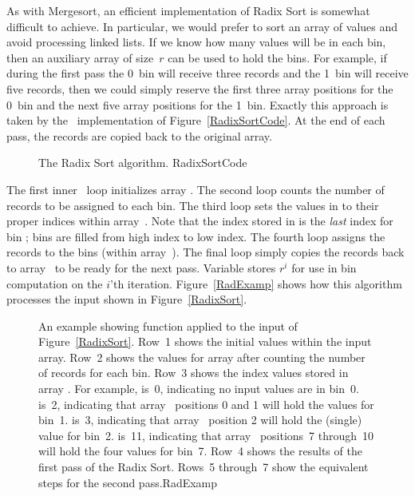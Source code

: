 As with Mergesort,
an efficient implementation of Radix Sort is
somewhat difficult to achieve.
In particular, we would prefer to sort
an array of values and avoid processing linked lists.  If we know how
many values will be in each bin, then an auxiliary array of size~\(r\)
can be used to hold the bins.
For example, if during the first pass the 0~bin will receive three
records and the 1~bin will receive five records, then we could simply
reserve the first three array positions for the 0~bin and the next
five array positions for the 1~bin.
Exactly this approach is taken by the \Lang\ implementation of
Figure~\ref{RadixSortCode}.
At the end of each pass, the records are copied back to the original
array.

\begin{figure}

\vspace{-\bigskipamount}
\vspace{-\smallskipamount}

{The Radix Sort algorithm.}
{RadixSortCode}
\vspace{-\smallskipamount}
\end{figure}

\newpage

The first inner \Cfor\ loop initializes array .  The
second loop counts the number of records to be assigned to each bin.
The third loop sets the values in  to their proper indices
within array~.
Note that the index stored in 
is the \emph{last} index for bin ; bins are filled from high
index to low index.
The fourth loop assigns the records to the bins (within
array~).
The final loop simply copies the records back to
array~ to be ready for the next pass.
Variable  stores \(r^i\) for use in bin computation on the
\(i\)'th iteration.
Figure~\ref{RadExamp} shows how this algorithm processes the input
shown in Figure~\ref{RadixSort}.

\begin{figure}
\bigskip
{}
{An example showing function  applied to the input of
Figure~\ref{RadixSort}.
Row~1 shows the initial values within the input array.
Row~2 shows the values for array  after
counting the number of records for each bin.
Row~3 shows the index values stored in array .
For example,  is~0, indicating no input values are in
bin~0.
 is~2, indicating that array~ positions 0 and 1
will hold the values for bin~1.
 is~3, indicating that array~ position 2 will
hold the (single) value for bin~2.
 is~11, indicating that array~ positions~7
through~10 will hold the four values for bin~7.
Row~4 shows the results of the first pass of the Radix Sort.
Rows~5 through~7 show the equivalent steps for the second
pass.}{RadExamp}
\bigskip
\end{figure}

